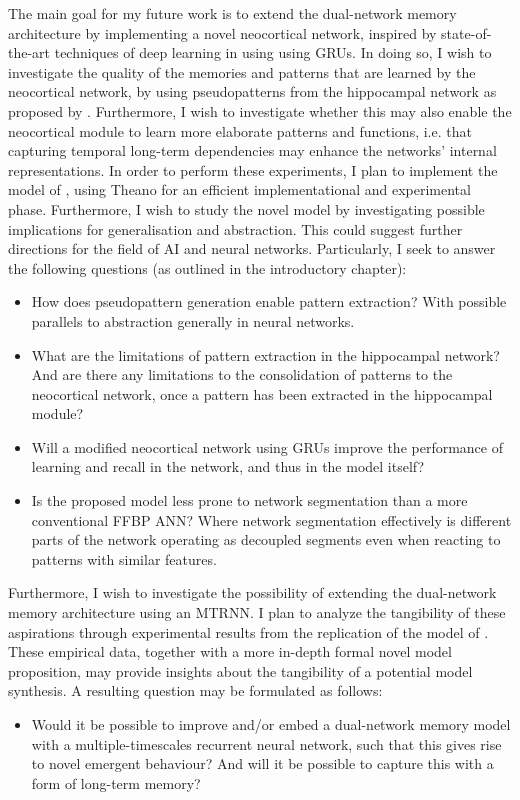 The main goal for my future work is to extend the dual-network memory architecture by implementing a novel neocortical network, inspired by state-of-the-art techniques of deep learning in using using GRUs. In doing so, I wish to investigate the quality of the memories and patterns that are learned by the neocortical network, by using pseudopatterns from the hippocampal network as proposed by \cite{Hattori2014}. Furthermore, I wish to investigate whether this may also enable the neocortical module to learn more elaborate patterns and functions, i.e. that capturing temporal long-term dependencies may enhance the networks' internal representations.
In order to perform these experiments, I plan to implement the model of \cite{Hattori2014}, using Theano for an efficient implementational and experimental phase. Furthermore, I wish to study the novel model by investigating possible implications for generalisation and abstraction. This could suggest further directions for the field of AI and neural networks. Particularly, I seek to answer the following questions (as outlined in the introductory chapter):
\begin{itemize}
\item How does pseudopattern generation enable pattern extraction? With possible parallels to abstraction generally in neural networks.
\item What are the limitations of pattern extraction in the hippocampal network? And are there any limitations to the consolidation of patterns to the neocortical network, once a pattern has been extracted in the hippocampal module?
\item Will a modified neocortical network using GRUs improve the performance of learning and recall in the network, and thus in the model itself?
\item Is the proposed model less prone to network segmentation than a more conventional FFBP ANN? Where network segmentation effectively is different parts of the network operating as decoupled segments even when reacting to patterns with similar features.
\end{itemize}

Furthermore, I wish to investigate the possibility of extending the dual-network memory architecture using an MTRNN. I plan to analyze the tangibility of these aspirations through experimental results from the replication of the model of \cite{Hattori2014}. These empirical data, together with a more in-depth formal novel model proposition, may provide insights about the tangibility of a potential model synthesis. A resulting question may be formulated as follows:
\begin{itemize}
\item Would it be possible to improve and/or embed a dual-network memory model with a multiple-timescales recurrent neural network, such that this gives rise to novel emergent behaviour? And will it be possible to capture this with a form of long-term memory?
\end{itemize}

